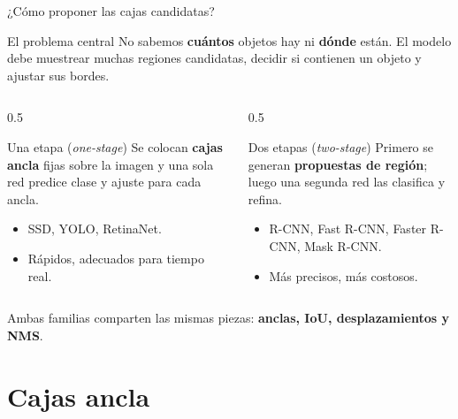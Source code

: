 \documentclass[aspectratio=169, 10pt]{beamer}
\begin{document}
\begin{frame}{¿Cómo proponer las cajas candidatas?}
	\begin{block}{El problema central}
		No sabemos \textbf{cuántos} objetos hay ni \textbf{dónde} están. El modelo debe muestrear muchas regiones candidatas, decidir si contienen un objeto y ajustar sus bordes.
	\end{block}
	\vspace{0.2cm}
	\begin{columns}[T]
		\begin{column}{0.5\textwidth}
			\begin{exampleblock}{Una etapa (\textit{one-stage})}
				Se colocan \textbf{cajas ancla} fijas sobre la imagen y una sola red predice clase y ajuste para cada ancla.
				\begin{itemize}
					\item SSD, YOLO, RetinaNet.
					\item Rápidos, adecuados para tiempo real.
				\end{itemize}
			\end{exampleblock}
		\end{column}
		\begin{column}{0.5\textwidth}
			\begin{alertblock}{Dos etapas (\textit{two-stage})}
				Primero se generan \textbf{propuestas de región}; luego una segunda red las clasifica y refina.
				\begin{itemize}
					\item R-CNN, Fast R-CNN, Faster R-CNN, Mask R-CNN.
					\item Más precisos, más costosos.
				\end{itemize}
			\end{alertblock}
		\end{column}
	\end{columns}
	\vspace{0.2cm}
	\centering Ambas familias comparten las mismas piezas: \textbf{anclas, IoU, desplazamientos y NMS}.
\end{frame}

\section{Cajas ancla}
\end{document}
